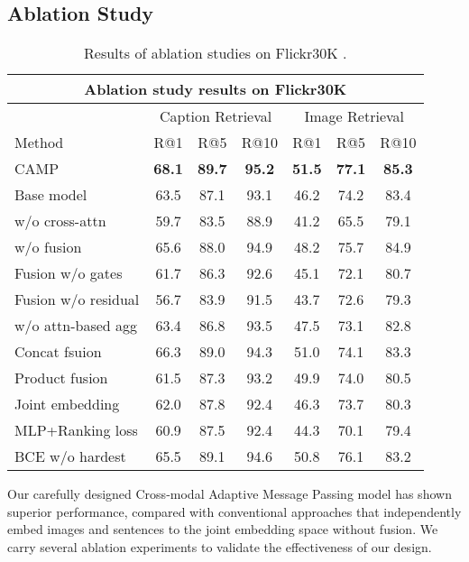 \documentclass[10pt,twocolumn,letterpaper]{article}
\begin{document}
\subsection{Ablation Study}
\label{sec:ablation}
\setlength{\tabcolsep}{2pt}
\begin{table}[t]
\footnotesize
\begin{center}
\begin{tabular}{|l|ccc|ccc|}
\hline
 \multicolumn{7}{|c|}{Ablation study results on Flickr30K} \\
\hline
& \multicolumn{3}{c|}{Caption Retrieval}
& \multicolumn{3}{c|}{Image Retrieval} \\

{Method}
& {R@1} & {R@5} & {R@10}
& {R@1} & {R@5} & {R@10}  \\
\hline\hline
CAMP & \textbf{68.1} & \textbf{89.7} & \textbf{95.2} & \textbf{51.5} & \textbf{77.1} & \textbf{85.3} \\
\hline
Base model & 63.5 & 87.1 & 93.1 & 46.2 & 74.2 & 83.4 \\
w/o cross-attn & 59.7 & 83.5 &  88.9 & 41.2 & 65.5 & 79.1 \\
w/o fusion & 65.6 & 88.0 & 94.9 & 48.2 & 75.7 & 84.9 \\
Fusion w/o gates & 61.7 & 86.3 & 92.6 & 45.1 & 72.1 & 80.7 \\
Fusion w/o residual & 56.7 & 83.9 & 91.5 & 43.7 & 72.6 & 79.3 \\
w/o attn-based agg & 63.4 & 86.8 & 93.5 & 47.5 & 73.1 & 82.8 \\
Concat fsuion & 66.3 & 89.0 & 94.3 & 51.0 & 74.1 & 83.3 \\
Product fusion & 61.5 & 87.3 & 93.2 & 49.9 & 74.0& 80.5 \\
Joint embedding & 62.0 & 87.8 & 92.4 & 46.3 & 73.7 & 80.3 \\
MLP+Ranking loss & 60.9 & 87.5 & 92.4 & 44.3 & 70.1 & 79.4 \\
BCE w/o hardest & 65.5 & 89.1 & 94.6 & 50.8 & 76.1 & 83.2 \\
\hline

\end{tabular}
\end{center}
\vspace{-2mm}
\caption{Results of ablation studies on Flickr30K .}
\label{tab:ablation}
\vspace{-5mm}
\end{table}


Our carefully designed Cross-modal Adaptive Message Passing model has shown superior performance, compared with conventional approaches that independently embed images and sentences to the joint embedding space without fusion. We carry several ablation experiments to validate the effectiveness of our design.
\end{document}
